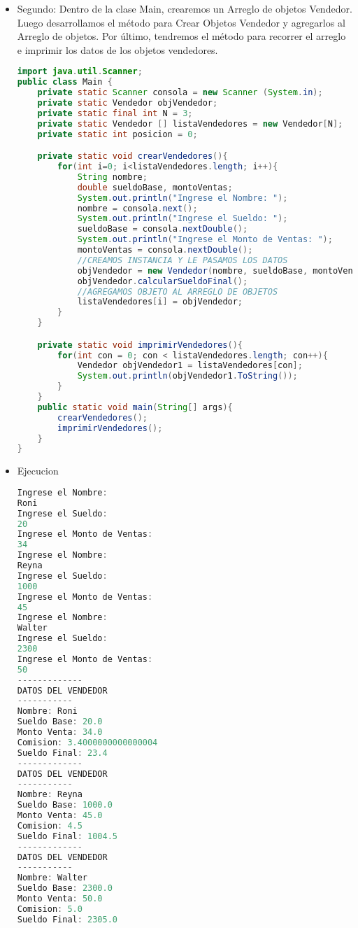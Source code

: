 \documentclass{article}
\begin{document}
\begin{itemize}
\begin{lstlisting}[language=java]
        return abMensaje.toString();
    }
}
        \end{lstlisting}
		\item Segundo: Dentro de la clase Main, crearemos un Arreglo de objetos Vendedor. Luego desarrollamos el método para Crear Objetos Vendedor y agregarlos al Arreglo de objetos. Por último, tendremos el método para recorrer el arreglo e imprimir los datos de los objetos vendedores.
        \begin{lstlisting}[language=java]
import java.util.Scanner;
public class Main {
    private static Scanner consola = new Scanner (System.in);
    private static Vendedor objVendedor;
    private static final int N = 3;
    private static Vendedor [] listaVendedores = new Vendedor[N];
    private static int posicion = 0;

    private static void crearVendedores(){
        for(int i=0; i<listaVendedores.length; i++){
            String nombre;
            double sueldoBase, montoVentas;
            System.out.println("Ingrese el Nombre: ");
            nombre = consola.next();
            System.out.println("Ingrese el Sueldo: ");
            sueldoBase = consola.nextDouble();
            System.out.println("Ingrese el Monto de Ventas: ");
            montoVentas = consola.nextDouble();
            //CREAMOS INSTANCIA Y LE PASAMOS LOS DATOS
            objVendedor = new Vendedor(nombre, sueldoBase, montoVentas);
            objVendedor.calcularSueldoFinal();
            //AGREGAMOS OBJETO AL ARREGLO DE OBJETOS
            listaVendedores[i] = objVendedor;
        }
    }

    private static void imprimirVendedores(){
        for(int con = 0; con < listaVendedores.length; con++){
            Vendedor objVendedor1 = listaVendedores[con];
            System.out.println(objVendedor1.ToString());
        }
    }
    public static void main(String[] args){
        crearVendedores();
        imprimirVendedores();
    }
}
        \end{lstlisting}
        \item Ejecucion
        \begin{lstlisting}[language=java]
Ingrese el Nombre: 
Roni
Ingrese el Sueldo: 
20
Ingrese el Monto de Ventas: 
34
Ingrese el Nombre: 
Reyna
Ingrese el Sueldo: 
1000
Ingrese el Monto de Ventas: 
45
Ingrese el Nombre: 
Walter
Ingrese el Sueldo: 
2300
Ingrese el Monto de Ventas: 
50
-------------
DATOS DEL VENDEDOR
-----------
Nombre: Roni
Sueldo Base: 20.0
Monto Venta: 34.0
Comision: 3.4000000000000004
Sueldo Final: 23.4
-------------
DATOS DEL VENDEDOR
-----------
Nombre: Reyna
Sueldo Base: 1000.0
Monto Venta: 45.0
Comision: 4.5
Sueldo Final: 1004.5
-------------
DATOS DEL VENDEDOR
-----------
Nombre: Walter
Sueldo Base: 2300.0
Monto Venta: 50.0
Comision: 5.0
Sueldo Final: 2305.0
        \end{lstlisting}


\end{itemize}
\end{document}
